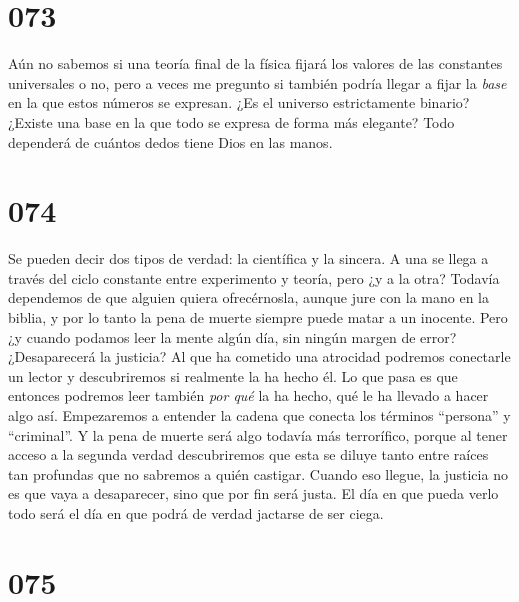 \documentclass[a4paper,11pt,openright,twocolumn]{book}
\begin{document}
\section*{073}

Aún no sabemos si una teoría final de la física fijará los valores de las constantes universales o no, pero 
a veces me pregunto si también podría llegar a fijar la {\it base}   en la que estos números se expresan. 
¿Es el universo estrictamente binario? ¿Existe una base en la que todo se expresa de forma más elegante? 
Todo dependerá de cuántos dedos tiene Dios en las manos.

\section*{074}

Se pueden decir dos tipos de verdad: la científica y la sincera. A una se llega a través del ciclo constante
entre experimento
y teoría, pero ¿y a la otra? Todavía dependemos de que alguien quiera ofrecérnosla, aunque jure con la mano
en la biblia, y por
lo tanto la pena de muerte siempre puede matar a un inocente. Pero ¿y cuando podamos leer la mente algún
día, sin ningún margen de error? ¿Desaparecerá la justicia? Al que ha cometido una
atrocidad podremos conectarle un lector y descubriremos si realmente la ha hecho él. Lo que pasa es que
entonces podremos leer también {\it por qué}   la ha hecho, qué le ha llevado a hacer algo así. Empezaremos
a entender la cadena que conecta los términos ``persona'' y ``criminal''. Y la pena de muerte será algo todavía
más terrorífico, porque al tener acceso a la segunda verdad descubriremos que esta se diluye tanto entre
raíces tan profundas que no sabremos a quién castigar. Cuando eso llegue, la justicia no es que vaya a 
desaparecer, sino que por fin será justa. El día en que pueda verlo todo será el día en que podrá de verdad
jactarse de ser ciega.

\section*{075}
\end{document}
